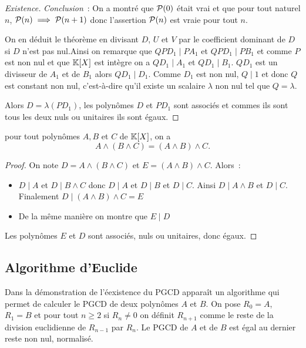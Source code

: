 \begin{proof}[Existence]
  \emph{Conclusion}~: On a montré que \(\P(0)\) était vrai et que pour tout 
  naturel \(n\), \(\P(n)\implies\P(n+1)\) donc l'assertion \(\P(n)\) est vraie 
  pour tout \(n\).

  On en déduit le théorème en divisant \(D\), \(U\) et \(V\) par le coefficient 
  dominant de \(D\) si \(D\) n'est pas nul.Ainsi on remarque que  \(QPD_1 
  \mid{}PA_1\) et \(QPD_1\mid{}PB_1\) et comme \(P\) est non nul et que 
  \(\K[X]\) est intègre on a \(QD_1 \mid{}A_1\) et \(QD_1\mid{}B_1\). \(QD_1\) 
  est un divisseur de \(A_1\) et de \(B_1\) alors \(QD_1\mid{}D_1\). Comme 
  \(D_1\) est non nul, \(Q\mid{}1\) et donc \(Q\) est constant non nul, 
  c'est-à-dire qu'il existe un scalaire \(\lambda\) non nul tel que 
  \(Q = \lambda\). 

  Alors \(D = \lambda(PD_1)\), les polynômes \(D\) et \(PD_1\) sont associés et 
  commes ils sont tous les deux nuls ou unitaires ils sont égaux.
\end{proof}

\begin{prop}[Associativité]
  pour tout polynômes \(A,B\) et \(C\) de \(\K[X]\), on a
  \begin{equation}
    A \wedge (B\wedge C) = (A\wedge B) \wedge C.
  \end{equation}
\end{prop}
\begin{proof}
  On note \(D = A \wedge (B\wedge C)\) et \(E = (A\wedge B) \wedge C\). Alors~:
  \begin{itemize}
    \item \(D\mid{}A\) et \(D\mid{}B \wedge C\) donc \(D\mid{}A\) et 
      \(D\mid{}B\) et \(D\mid{} C\). Ainsi \(D\mid{}A \wedge B\) et 
      \(D\mid{}C\). Finalement \(D\mid{}(A\wedge B) \wedge C = E\)
    \item De la même manière on montre que \(E\mid{}D\)
  \end{itemize}
  Les polynômes \(E\) et \(D\) sont associés, nuls ou unitaires, donc égaux.
\end{proof}

\subsection{Algorithme d'Euclide}

Dans la démonstration de l'éexistence du PGCD apparaît un algorithme qui permet 
de calculer le PGCD de deux polynômes \(A\) et \(B\). On pose \(R_0 = A\), 
\(R_1 = B\) et pour tout \(n\geqslant 2\)
si \(R_n \neq 0\) on définit \(R_{n+1}\) comme le reste de la division 
euclidienne de \(R_{n-1}\) par \(R_n\). Le PGCD de \(A\) et de \(B\) est égal au 
dernier reste non nul, normalisé.


